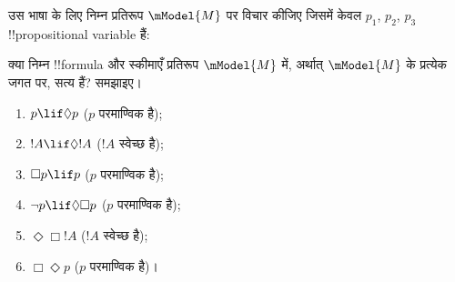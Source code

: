 \documentclass[../../../include/open-logic-section]{subfiles}
\begin{document}
\begin{prob}
  उस भाषा के लिए निम्न प्रतिरूप $\mModel{M}$ पर विचार कीजिए जिसमें केवल
  $p_1$, $p_2$, $p_3$ !!{propositional variable} हैं:
  \begin{center}
  \end{center}
  क्या निम्न !!{formula} और स्कीमाएँ प्रतिरूप $\mModel{M}$ में, अर्थात्
  $\mModel{M}$ के प्रत्येक जगत पर, सत्य हैं? समझाइए।
  \begin{enumerate}
  \item $p\lif \Diamond p$ ($p$ परमाण्विक है);
  \item $!A\lif \Diamond !A$ ($!A$ स्वेच्छ है);
  \item $\Box p \lif p$ ($p$ परमाण्विक है);
  \item $\lnot p \lif \Diamond \Box p$ ($p$ परमाण्विक है);
  \item $\Diamond \Box !A$ ($!A$ स्वेच्छ है);
  \item $\Box \Diamond p$ ($p$ परमाण्विक है)।
  \end{enumerate}
\end{prob}
\end{document}
